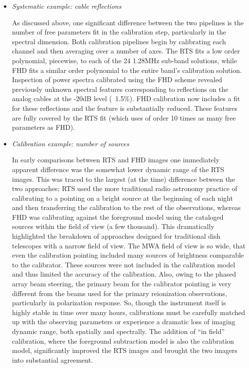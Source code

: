 \documentclass[twolcolumn]{emulateapj}
\begin{document}
\begin{itemize}

\item \emph{ Systematic example: cable reflections}

As discussed above, one significant difference between the two pipelines is the number of free parameters fit in the calibration step, particularly in the spectral dimension.  Both calibration pipelines begin by calibrating each channel and then averaging over a number of axes.  The RTS fits a low order polynomial, piecewise, to each of the 24 1.28MHz sub-band solutions, while FHD fits a similar order polynomial to the entire  band's calibration solution.  Inspection of power spectra calibrated using the FHD scheme revealed previously unknown spectral features corresponding to reflections on the analog cables at the -20dB level (~1.5\%). FHD calibration now includes a fit for these reflections and the feature is substantially reduced. These features are fully covered by the RTS fit (which uses of order 10 times as many free parameters as FHD). 

\item \emph{Calibration example: number of sources}

In early comparisons between RTS and FHD images one immediately apparent difference was the somewhat lower dynamic range of the RTS images.  This was traced to the largest (at the time) difference between the two approaches; RTS used the more traditional radio astronomy practice of calibrating to a pointing on a bright source at the beginning of each night and then transferring the calibration to the rest of the observations, whereas FHD was calibrating against the foreground model using the cataloged sources within the field of view (a few thousand). This dramatically highlighted the breakdown of approaches designed for traditional dish telescopes with a narrow field of view.  The MWA field of view is so wide, that even the calibration pointing included many sources of brightness comparable to the calibrator. These sources were not included in the calibration model and thus limited the accuracy of the calibration. Also, owing to the phased array beam steering, the primary beam for the calibrator pointing is very different from the beams used for the primary reionization observations, particularly in polarization response.  So, though the instrument itself is highly stable in time over many hours, calibrations must be carefully matched up with the observing parameters or experience a dramatic loss of imaging dynamic range, both spatially and spectrally. The addition of ``in field'' calibration, where the foreground subtraction model is also the calibration model, significantly improved the RTS images and brought the two imagers into substantial agreement. 



\end{itemize}
\end{document}
